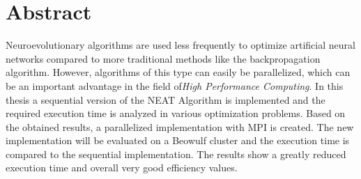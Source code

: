 \section*{Abstract}
Neuroevolutionary algorithms are used less frequently to optimize artificial neural networks compared to more traditional methods like the backpropagation algorithm. However, algorithms of this type can easily be parallelized, which can be an important advantage in the field of\emph{High Performance Computing}. In this thesis a sequential version of the NEAT Algorithm is implemented and the required execution time is analyzed in various optimization problems. Based on the obtained results, a parallelized implementation with MPI is created. The new implementation will be evaluated on a Beowulf cluster and the execution time is compared to the sequential implementation. The results show a greatly reduced execution time and overall very good efficiency values.
